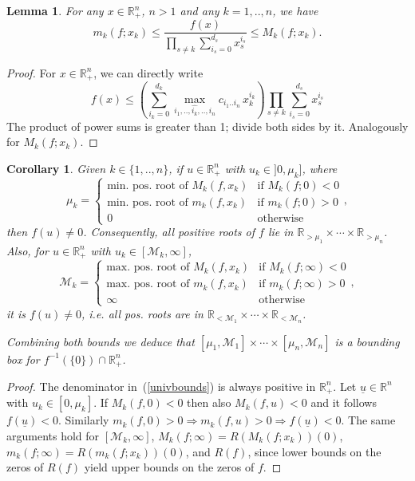 \documentclass{sig-alternate}
\newtheorem{lemma}[theorem]{Lemma}
\newtheorem{corollary}[theorem]{Corollary}
\newcommand{\ds}{\displaystyle}
\newcommand{\dott}{{..}}
\def\RR{\mathbb{R}}
\newcommand{\uvec}[1]{\underline{#1}}
\begin{document}
\begin{lemma} \label{u_bounds}
  For any $ x \in \RR^n_{+}$, $n>1$ and any $k = 1, \dott, n$, we have
\begin{equation}\label{univbounds}
   m_k (f ; x_k) \le \frac{ f ( x)}{\ds \prod_{s\ne k}  \sum_{i_s=0}^{d_s} x_s^{i_s} } \le M_k (f ; x_k)  . 
\end{equation}
\end{lemma}
\begin{proof}
For $x \in \RR_{+}^{n}$, we can directly write
$$  f ( x) \leq \left( 
\sum_{i_k = 0}^{d_k} \max_{i_1,..,\widehat{i_k},.., i_n } c_{i_1 \dott i_n} \, x_k^{i_k}\right) 
\prod_{s\ne k}  \sum_{i_s=0}^{d_s} x_s^{i_s} $$
The product of power sums is greater than 1; divide both sides by it. Analogously for $M_k(f ; x_k)$.
\end{proof}

\begin{corollary} \label{cbounds}
Given $k\in\{1,\dott, n\}$, if $u\in \RR_+^n$ with $u_k\in]0,\mu_k]$,
where 
 $$
 \mu_k= 
 \left\{\begin{array}{cc}
 \text{min. pos. root of $M_k(f,x_k)$}  &  \text{if $M_k(f;0)<0$}\\  
 \text{min. pos. root of $m_k(f,x_k)$}  &  \text{if $m_k(f;0)>0$}\\
  0  & \text{otherwise}
 \end{array}\right. ,
 $$
then $f(u)\ne 0$. Consequently, all positive roots of $f$ lie in
$\RR_{>\mu_1}\times\cdots\times\RR_{>\mu_n}$. Also, for $u\in \RR_+^n$ with $u_k\in[\mathcal M_k,\infty]$,
 $$
\mathcal M_k= 
 \left\{\begin{array}{cc}
 \text{max. pos. root of $M_k(f,x_k)$}  &  \text{if $M_k(f;\infty)<0$}\\  
 \text{max. pos. root of $m_k(f,x_k)$}  &  \text{if $m_k(f;\infty)>0$}\\
  \infty  & \text{otherwise}
 \end{array}\right.,
 $$
it is $f(u)\ne 0$, i.e. all pos. roots are in $\RR_{<\mathcal M_1}\times\cdots\times\RR_{<\mathcal M_n}$.

Combining both bounds we deduce that 
$[\mu_1,\mathcal M_1]\times\cdots\times [\mu_n,\mathcal M_n] $ 
is a bounding box for $f^{-1}(\{0\})\cap \RR_+^n$.
\end{corollary}
\begin{proof}
  The denominator in~(\ref{univbounds}) is always positive in
  $\RR_+^n$. Let $\uvec u\in\RR^n$ with $u_k\in[0,\mu_k]$. If
  $M_k(f,0)<0$ then also $M_k(f,u)<0$ and it follows $f(\uvec
  u)<0$. Similarly $m_k(f,0)>0 \Rightarrow m_k(f,u)>0 \Rightarrow
  f(\uvec u)<0$. The same arguments hold for $[\mathcal M_k,\infty]$,
  $M_k(f;\infty)=R(M_k(f;x_k))(0)$, $m_k(f;\infty)=R(m_k(f;x_k))(0)$,
  and $R(f)$, since lower bounds on the zeros of $R(f)$ yield upper
  bounds on the zeros of $f$.
\end{proof}
\end{document}
